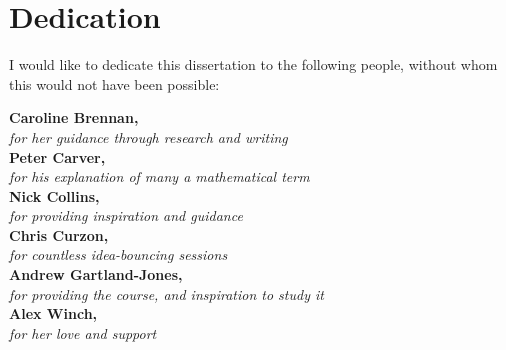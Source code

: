 \section*{Dedication}
I would like to dedicate this dissertation to the following people, without whom this would not have been possible:\\[2cm]
\newcommand{\dedicate}[2]{
\textbf{#1,}\\
\indent \textit{#2}\\[0.5cm]}
\dedicate{Caroline Brennan}{for her guidance through research and writing}
\dedicate{Peter Carver}{for his explanation of many a mathematical term}
\dedicate{Nick Collins}{for providing inspiration and guidance}
\dedicate{Chris Curzon}{for countless idea-bouncing sessions}
\dedicate{Andrew Gartland-Jones}{for providing the course, and inspiration to study it}
\dedicate{Alex Winch}{for her love and support}
